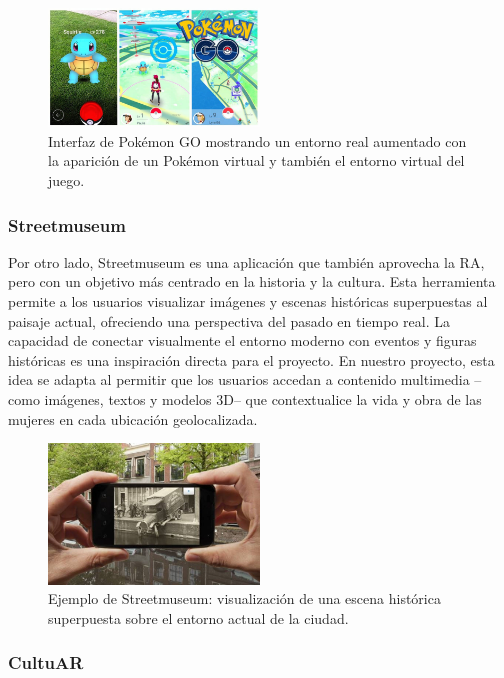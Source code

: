 \begin{figure}[H]
    \centering
    \includegraphics[width=0.5\textwidth]{figs/pokemon_go.jpg}
    \caption{Interfaz de Pokémon GO mostrando un entorno real aumentado con la aparición de un Pokémon virtual y también el entorno virtual del juego.}
    \label{fig:pokemon_go}
\end{figure}

\subsubsection{Streetmuseum}

Por otro lado, Streetmuseum es una aplicación que también aprovecha la RA, pero con un objetivo más centrado en la historia y la cultura. Esta herramienta permite a los usuarios visualizar imágenes y escenas históricas superpuestas al paisaje actual, ofreciendo una perspectiva del pasado en tiempo real. La capacidad de conectar visualmente el entorno moderno con eventos y figuras históricas es una inspiración directa para el proyecto. En nuestro proyecto, esta idea se adapta al permitir que los usuarios accedan a contenido multimedia –como imágenes, textos y modelos 3D– que contextualice la vida y obra de las mujeres en cada ubicación geolocalizada.

\begin{figure}[H]
    \centering
    \includegraphics[width=0.5\textwidth]{figs/streetmuseum.png}
    \caption{Ejemplo de Streetmuseum: visualización de una escena histórica superpuesta sobre el entorno actual de la ciudad.}
    \label{fig:streetmuseum}
\end{figure}

\subsubsection{CultuAR}

